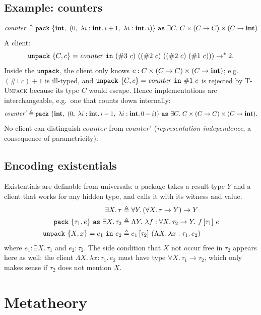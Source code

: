 \subsection{Example: counters}
\[
\mathit{counter} \triangleq \ttkw{pack}\ \{\kw{int},\ (0,\ \lambda i : \kw{int}.\, i + 1,\ \lambda i : \kw{int}.\, i)\}\ \ttkw{as}\ \exists C.\ C \times (C \to C) \times (C \to \kw{int})
\]
A client:
\[
\ttkw{unpack}\ \{C, c\} = \mathit{counter}\ \ttkw{in}\ (\#3\ c)\ ((\#2\ c)\ ((\#2\ c)\ (\#1\ c))) \to^* 2.
\]
Inside the $\mathtt{unpack}$, the client only knows
$c : C \times (C \to C) \times (C \to \mathbf{int})$; e.g.\ $(\#1\ c) + 1$ is ill-typed,
and $\mathtt{unpack}\ \{C, c\} = \mathit{counter}\ \mathtt{in}\ \#1\ c$ is rejected by
\textsc{T-Unpack} because its type $C$ would escape. Hence implementations are
interchangeable, e.g.\ one that counts down internally:
\[
\mathit{counter}' \triangleq \mathtt{pack}\ \{\mathbf{int},\ (0,\ \lambda i : \mathbf{int}.\, i - 1,\ \lambda i : \mathbf{int}.\, 0 - i)\}\ \mathtt{as}\ \exists C.\ C \times (C \to C) \times (C \to \mathbf{int}).
\]
No client can distinguish $\mathit{counter}$ from $\mathit{counter}'$ (\emph{representation
independence}, a consequence of parametricity).

\subsection{Encoding existentials}
Existentials are definable from universals: a package takes a result type $Y$ and a
client that works for any hidden type, and calls it with its witness and value.
\begin{align*}
\exists X.\, \tau &\triangleq \forall Y.\, (\forall X.\, \tau \to Y) \to Y \\
\ttkw{pack}\ \{\tau_1, e\}\ \ttkw{as}\ \exists X.\, \tau_2 &\triangleq \Lambda Y.\ \lambda f : \forall X.\, \tau_2 \to Y.\ f\,[\tau_1]\ e \\
\ttkw{unpack}\ \{X, x\} = e_1\ \ttkw{in}\ e_2 &\triangleq e_1\,[\tau_2]\ (\Lambda X.\, \lambda x : \tau_1.\, e_2)
\end{align*}
where $e_1 : \exists X.\, \tau_1$ and $e_2 : \tau_2$. The side condition that $X$ not
occur free in $\tau_2$ appears here as well: the client $\Lambda X.\, \lambda x :
\tau_1.\, e_2$ must have type $\forall X.\, \tau_1 \to \tau_2$, which only makes sense
if $\tau_2$ does not mention $X$.

\section{Metatheory}\label{sec:meta}

